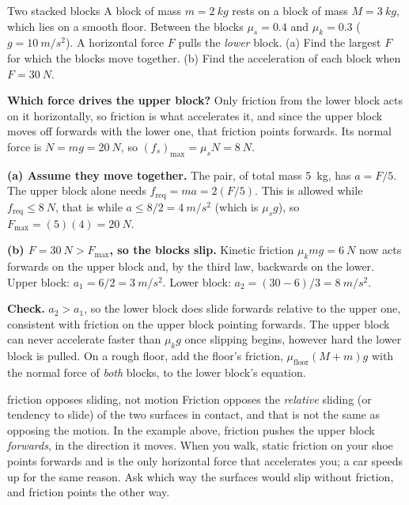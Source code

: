 \begin{exbox}{Two stacked blocks}\label{ex:stacked}
A block of mass $m=\SI{2}{kg}$ rests on a block of mass $M=\SI{3}{kg}$, which lies on a smooth floor. Between the blocks
$\mu_s=0.4$ and $\mu_k=0.3$ ($g=\SI{10}{m/s^2}$). A horizontal force $F$ pulls the \emph{lower} block.
(a) Find the largest $F$ for which the blocks move together. (b) Find the acceleration of each block
when $F=\SI{30}{N}$.

 \textbf{Which force drives the upper block?} Only friction from the lower block acts on it
horizontally, so friction is what accelerates it, and since the upper block moves off forwards with
the lower one, that friction points forwards. Its normal force is
$N=mg=\SI{20}{N}$, so $(f_s)_{\max}=\mu_sN=\SI{8}{N}$.

 \textbf{(a) Assume they move together.} The pair, of total mass \SI{5}{kg}, has
$a=F/5$. The upper block alone needs $f_{\text{req}}=ma=2(F/5)$. This is allowed while
$f_{\text{req}}\le\SI{8}{N}$, that is while $a\le 8/2=\SI{4}{m/s^2}$ (which is $\mu_sg$), so
$F_{\max}=(5)(4)=\SI{20}{N}$.

 \textbf{(b) $F=\SI{30}{N}>F_{\max}$, so the blocks slip.} Kinetic friction
$\mu_kmg=\SI{6}{N}$ now acts forwards on the upper block and, by the third law, backwards on the lower.
Upper block: $a_1=6/2=\SI{3}{m/s^2}$. Lower block: $a_2=(30-6)/3=\SI{8}{m/s^2}$.

 \textbf{Check.} $a_2>a_1$, so the lower block does slide forwards relative to the upper one,
consistent with friction on the upper block pointing forwards. The upper block can never accelerate
faster than $\mu_kg$ once slipping begins, however hard the lower block is pulled. On a rough floor, add
the floor's friction, $\mu_{\text{floor}}(M+m)g$ with the normal force of \emph{both} blocks, to the
lower block's equation.
\end{exbox}

\begin{trapbox}{friction opposes sliding, not motion}
Friction opposes the \emph{relative} sliding (or tendency to slide) of the two surfaces in contact, and
that is not the same as opposing the motion. In the example above, friction pushes the upper block
\emph{forwards}, in the direction it moves. When you walk, static friction on your shoe points forwards
and is the only horizontal force that accelerates you; a car speeds up for the same reason. Ask which
way the surfaces would slip without friction, and friction points the other way.
\end{trapbox}

